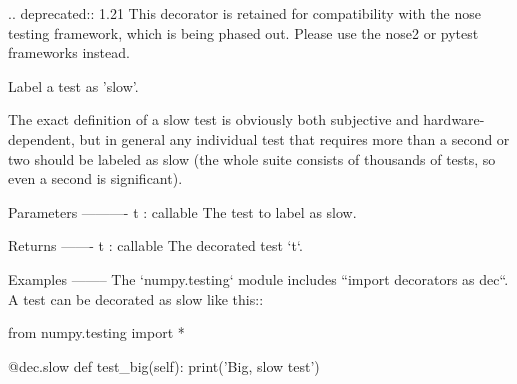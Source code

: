 \begin{DoxyVerb}.. deprecated:: 1.21
    This decorator is retained for compatibility with the nose testing framework, which is being phased out.
    Please use the nose2 or pytest frameworks instead.

Label a test as 'slow'.

The exact definition of a slow test is obviously both subjective and
hardware-dependent, but in general any individual test that requires more
than a second or two should be labeled as slow (the whole suite consists of
thousands of tests, so even a second is significant).

Parameters
----------
t : callable
    The test to label as slow.

Returns
-------
t : callable
    The decorated test `t`.

Examples
--------
The `numpy.testing` module includes ``import decorators as dec``.
A test can be decorated as slow like this::

  from numpy.testing import *

  @dec.slow
  def test_big(self):
      print('Big, slow test')\end{DoxyVerb}
 
